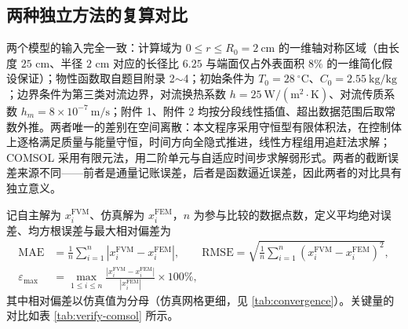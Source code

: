\documentclass[12pt,a4paper]{article}
\begin{document}
\subsection{两种独立方法的复算对比}

两个模型的输入完全一致：计算域为 $0\le r\le R_0=2\ \mathrm{cm}$ 的一维轴对称区域（由长度 $25$ cm、半径 $2$ cm 对应的长径比 $6.25$ 与端面仅占外表面积 $8\%$ 的一维简化假设保证）；物性函数取自题目附录 2$\sim$4；初始条件为 $T_0=28\ \mathrm{^\circ C}$、$C_0=2.55\ \mathrm{kg/kg}$；边界条件为第三类对流边界，对流换热系数 $h=25\ \mathrm{W/(m^2\cdot K)}$、对流传质系数 $h_m=8\times10^{-7}\ \mathrm{m/s}$；附件 1、附件 2 均按分段线性插值、超出数据范围后取常数外推。两者唯一的差别在空间离散：本文程序采用守恒型有限体积法，在控制体上逐格满足质量与能量守恒，时间方向全隐式推进，线性方程组用追赶法求解；COMSOL 采用有限元法，用二阶单元与自适应时间步求解弱形式。两者的截断误差来源不同——前者是通量记账误差，后者是函数逼近误差，因此两者的对比具有独立意义。

记自主解为 $x_i^{\mathrm{FVM}}$、仿真解为 $x_i^{\mathrm{FEM}}$，$n$ 为参与比较的数据点数，定义平均绝对误差、均方根误差与最大相对偏差为
\begin{equation}
\begin{aligned}
\mathrm{MAE}&=\frac{1}{n}\sum_{i=1}^{n}\left|x_i^{\mathrm{FVM}}-x_i^{\mathrm{FEM}}\right|,\qquad
\mathrm{RMSE}=\sqrt{\frac{1}{n}\sum_{i=1}^{n}\left(x_i^{\mathrm{FVM}}-x_i^{\mathrm{FEM}}\right)^2},\\
\varepsilon_{\max}&=\max_{1\le i\le n}\frac{\left|x_i^{\mathrm{FVM}}-x_i^{\mathrm{FEM}}\right|}{\left|x_i^{\mathrm{FEM}}\right|}\times100\%,
\end{aligned}
\end{equation}
其中相对偏差以仿真值为分母（仿真网格更细，见 \ref{tab:convergence}）。关键量的对比如表 \ref{tab:verify-comsol} 所示。
\end{document}
